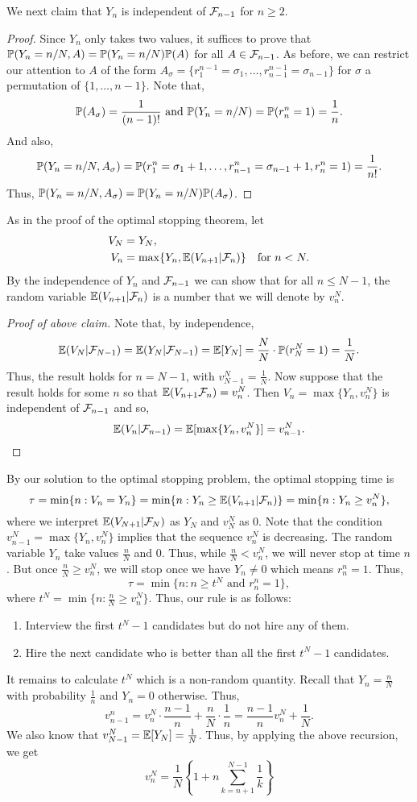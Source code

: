 We next claim that $Y_n$ is independent of ${\mathcal{F}}_{n-1}$ for $n \ge 2$. 
\begin{proof}
    Since $Y_n$ only takes two values, it suffices to prove that ${\mathbb{P}}(Y_n = n/N, A) = {\mathbb{P}}(Y_n = n/N){\mathbb{P}}(A)$ for all $A \in {\mathcal{F}}_{n-1}$. As before, we can restrict our attention to $A$ of the form $A_\sigma = \{r_1^{n-1}=\sigma_1,\ldots, r_{n-1}^{n-1} = \sigma_{n-1}\}$ for $\sigma$ a permutation of $\{1,\ldots,n-1\}$. Note that,
    \[{\mathbb{P}}(A_\sigma) = \frac{1}{(n-1)!} \text{ and } {\mathbb{P}}(Y_n = n/N) = {\mathbb{P}}(r_n^n = 1) = \frac{1}{n}. \]
    And also,
    \[{\mathbb{P}}(Y_n = n/N, A_\sigma) = {\mathbb{P}}(r_1^n = \sigma_1+1,\ldots, r_{n-1}^n = \sigma_{n-1}+1, r_n^n = 1) = \frac{1}{n!}. \]
    Thus, ${\mathbb{P}}(Y_n = n/N,A_\sigma) = {\mathbb{P}}(Y_n = n/N){\mathbb{P}}(A_\sigma)$. 
\end{proof}
As in the proof of the optimal stopping theorem, let 
\begin{align*}
    V_N &= Y_N,\\
    V_n &= \max\{Y_n, {\mathbb{E}}(V_{n+1}|{\mathcal{F}}_n)\} ~~~\text{for } n < N.
\end{align*}
By the independence of $Y_n$ and ${\mathcal{F}}_{n-1}$ we can show that for all $n \le N-1$, the random variable ${\mathbb{E}}(V_{n+1}|{\mathcal{F}}_n)$ is a number that we will denote by $v_n^N$. 
\begin{proof}[Proof of above claim]
    Note that, by independence, 
    \[{\mathbb{E}}(V_N|{\mathcal{F}}_{N-1})={\mathbb{E}}(Y_N|{\mathcal{F}}_{N-1})  ={\mathbb{E}}[Y_N] =\frac{N}{N}\cdot {\mathbb{P}}(r_N^N=1)=\frac{1}{N}.\]
    Thus, the result holds for $n = N-1$, with $v_{N-1}^N = \frac{1}{N}$. Now suppose that the result holds for some $n$ so that ${\mathbb{E}}(V_{n+1}{\mathcal{F}}_n) = v_n^N$. Then $V_n = \max\{Y_n, v_n^N\}$ is independent of ${\mathcal{F}}_{n-1}$ and so,
    \[{\mathbb{E}}(V_n|{\mathcal{F}}_{n-1})={\mathbb{E}}[\max\{Y_n, v_n^N\}] = v_{n-1}^N.\qedhere \]
\end{proof}
By our solution to the optimal stopping problem, the optimal stopping time is
\[ \tau = \min\{n : V_n = Y_n\} = \min\{n : Y_n \ge {\mathbb{E}}(V_{n+1}|{\mathcal{F}}_{n})\} = \min\{n : Y_n \ge v_n^N\},\]
where we interpret ${\mathbb{E}}(V_{N+1}|{\mathcal{F}}_N)$ as $Y_N$ and $v_N^N$ as 0. Note that the condition $v_{n-1}^N = \max\{Y_n, v_n^N\}$ implies that the sequence $v_n^N$ is decreasing. The random variable $Y_n$ take values $\frac{n}{N}$ and 0. Thus, while $\frac{n}{N} < v_n^N$, we will never stop at time $n$. But once $\frac{n}{N} \ge v_n^N$, we will stop once we have $Y_n \neq 0$ which means $r_n^n = 1$. Thus,
\[\tau = \min\{n : n \ge t^N \text{ and } r_n^n=1\}, \]
where $t^N = \min\{n : \frac{n}{N} \ge v_n^N\}$. Thus, our rule is as follows:
\begin{enumerate}
    \item Interview the first $t^N-1$ candidates but do not hire any of them.
    \item Hire the next candidate who is better than all the first  $t^N-1$ candidates.
\end{enumerate}  
It remains to calculate $t^N$ which is a non-random quantity. Recall that $Y_n = \frac{n}{N}$ with probability $\frac{1}{n}$ and $Y_n = 0$ otherwise. Thus,
\[v_{n-1}^n = v_n^N \cdot \frac{n-1}{n} + \frac{n}{N}\cdot \frac{1}{n} = \frac{n-1}{n}v_n^N + \frac{1}{N}. \]
We also know that $v_{N-1}^N = {\mathbb{E}}[Y_N] = \frac{1}{N}$. Thus, by applying the above recursion, we get
\[v_n^N = \frac{1}{N}\left\{1+n \sum_{k=n+1}^{N-1} \frac{1}{k}\right\} \]
